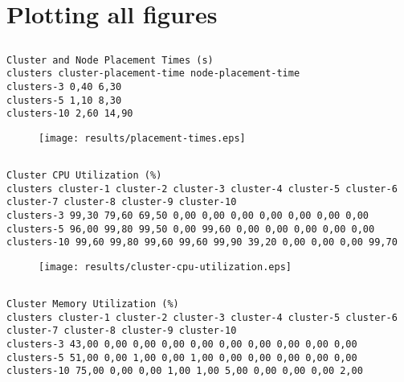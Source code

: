 \documentclass{elsart}
\begin{document}
\section{Plotting all figures}
\subsection{}

\begin{lstlisting}[caption={}]
Cluster and Node Placement Times (s)
clusters cluster-placement-time node-placement-time
clusters-3 0,40 6,30
clusters-5 1,10 8,30
clusters-10 2,60 14,90
\end{lstlisting}

\begin{figure}[ht]
\centering
\texttt{[image: results/placement-times.eps]}
\caption{}\label{fig:placement-times.eps}
\end{figure}

\subsection{}

\begin{lstlisting}[caption={}]
Cluster CPU Utilization (%)
clusters cluster-1 cluster-2 cluster-3 cluster-4 cluster-5 cluster-6 cluster-7 cluster-8 cluster-9 cluster-10
clusters-3 99,30 79,60 69,50 0,00 0,00 0,00 0,00 0,00 0,00 0,00
clusters-5 96,00 99,80 99,50 0,00 99,60 0,00 0,00 0,00 0,00 0,00
clusters-10 99,60 99,80 99,60 99,60 99,90 39,20 0,00 0,00 0,00 99,70
\end{lstlisting}

\begin{figure}[ht]
\centering
\texttt{[image: results/cluster-cpu-utilization.eps]}
\caption{}\label{fig:cluster-cpu-utilization.eps}
\end{figure}

\subsection{}

\begin{lstlisting}[caption={}]
Cluster Memory Utilization (%)
clusters cluster-1 cluster-2 cluster-3 cluster-4 cluster-5 cluster-6 cluster-7 cluster-8 cluster-9 cluster-10
clusters-3 43,00 0,00 0,00 0,00 0,00 0,00 0,00 0,00 0,00 0,00
clusters-5 51,00 0,00 1,00 0,00 1,00 0,00 0,00 0,00 0,00 0,00
clusters-10 75,00 0,00 0,00 1,00 1,00 5,00 0,00 0,00 0,00 2,00
\end{lstlisting}
\end{document}
